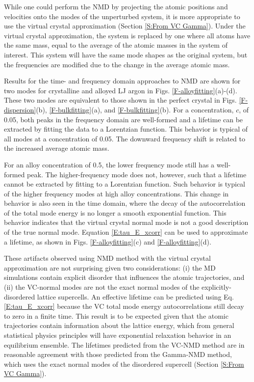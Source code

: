 While one could perform the NMD by projecting 
the atomic positions and velocities onto the modes of the unperturbed 
system, it is more appropriate to use the virtual crystal approximation 
(Section \ref{S:From VC Gamma}). 
Under the virtual 
crystal approximation, the system is replaced by one where all atoms 
have the same mass, equal to the average of the atomic masses in the 
system of interest. This system will have the same mode shapes as the 
original system, but the frequencies are modified due to the change 
in the average atomic mass.

Results for the time- and frequency domain approaches to NMD 
are shown for two modes for crystalline and alloyed LJ argon in 
Figs. \ref{F-alloyfitting}(a)-(d). These two modes are equivalent to 
those shown in the perfect crystal in 
Figs. \ref{F-dispersion}(b), \ref{F-bulkfitting}(a), and 
\ref{F-bulkfitting}(b). For a concentration, $c$, of 0.05, both peaks 
in the frequency domain are well-formed and a lifetime can be extracted 
by fitting the data to a Lorentzian function. This behavior is typical 
of all modes at a concentration of 0.05. The downward frequency shift 
is related to the increased average atomic mass.

For an alloy concentration of 0.5, the lower frequency mode still has 
a well-formed peak. The higher-frequency mode does not, however, such 
that a lifetime cannot be extracted by fitting to a Lorentzian function. 
Such behavior is typical of the higher frequency modes at high alloy 
concentrations. This change in behavior is also seen in the time domain, 
where the decay of the autocorrelation of the total mode energy is no 
longer a smooth exponential function. This behavior indicates that the 
virtual crystal normal mode is not a good description of the true 
normal mode. Equation \eqref{E:tau_E_xcorr} can be used to approximate a 
lifetime, as shown in Figs. \ref{F-alloyfitting}(c) and 
\ref{F-alloyfitting}(d).

These artifacts observed using NMD method with the virtual crystal 
approximation are not surprising given two considerations: 
(i) the MD simulations 
contain explicit disorder that influences the atomic trajectories, 
and (ii) the VC-normal modes are not the exact normal modes of the 
explicitly-disordered lattice supercells. 
An effective lifetime can be predicted 
using Eq. \eqref{E:tau_E_xcorr} 
because the VC total mode energy autocorrelations 
still decay to zero in a finite time. This result is to be expected 
given that the atomic trajectories contain 
information about the lattice energy, which from general statistical 
physics principles will have exponential relaxation behavior in an 
equilibrium ensemble.
\cite{landau_statistical_1980,srivastava_physics_1990,
rajabpour_thermal_2010} The lifetimes predicted from the VC-NMD method 
are in reasonable agreement with those predicted from the Gamma-NMD 
method, which uses the exact normal modes of the disordered supercell 
(Section \ref{S:From VC Gamma}).  

